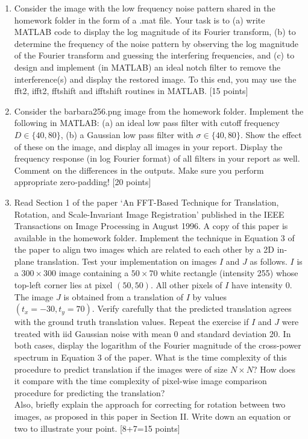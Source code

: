 \documentclass[11pt]{article}
\begin{document}
\begin{enumerate}
\item Consider the image with the low frequency noise pattern shared in the homework folder in the form of a .mat file. Your task is to (a) write MATLAB code to display the log magnitude of its Fourier transform, (b) to determine the frequency of the noise pattern by observing the log magnitude of the Fourier transform and guessing the interfering frequencies, and (c) to design and implement (in MATLAB) an ideal notch filter to remove the interference(s) and display the restored image. To this end, you may use the fft2, ifft2, fftshift and ifftshift routines in MATLAB. \textsf{[15 points]}

\item Consider the barbara256.png image from the homework folder. Implement the following in MATLAB: (a) an ideal low pass filter with cutoff frequency $D \in \{40, 80\}$, (b) a Gaussian low pass filter with $\sigma \in \{40,80\}$. Show the effect of these on the image, and display all images in your report. Display the frequency response (in log Fourier format) of all filters in your report as well. Comment on the differences in the outputs. Make sure you perform appropriate zero-padding! \textsf{[20 points]}

\item Read Section 1 of the paper `An FFT-Based Technique for Translation, Rotation, and Scale-Invariant Image Registration' published in the IEEE Transactions on Image Processing in August 1996. A copy of this paper is available in the homework folder. Implement the technique in Equation 3 of the paper to align two images which are related to each other by a 2D in-plane translation. Test your implementation on images $I$ and $J$ as follows. $I$ is a $300 \times 300$ image containing a $50 \times 70$ white rectangle (intensity 255) whose top-left corner lies at pixel $(50,50)$. All other pixels of $I$ have intensity 0. The image $J$ is obtained from a translation of $I$ by values $(t_x=-30,t_y=70)$. Verify carefully that the predicted translation agrees with the ground truth translation values. Repeat the exercise if $I$ and $J$ were treated with iid Gaussian noise with mean 0 and standard deviation 20. In both cases, display the logarithm of the Fourier magnitude of the cross-power spectrum in Equation 3 of the paper. What is the time complexity of this procedure to predict translation if the images were of size $N \times N$? How does it compare with the time complexity of pixel-wise image comparison procedure for predicting the translation? \\
Also, briefly explain the approach for correcting for rotation between two images, as proposed in this paper in Section II. Write down an equation or two to illustrate your point. \textsf{[8+7=15 points]}


\end{enumerate}
\end{document}

